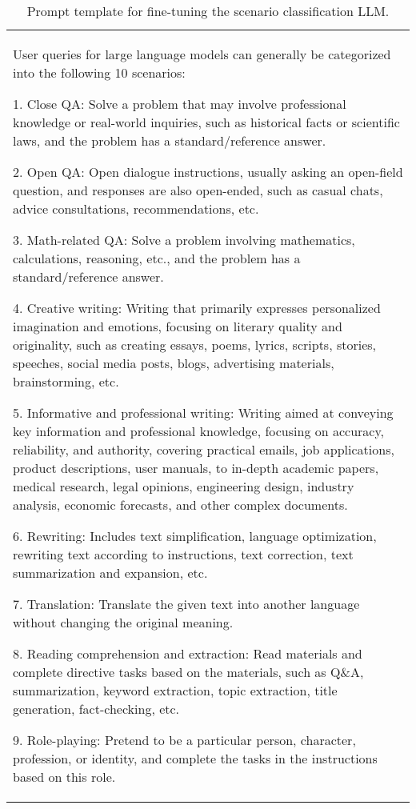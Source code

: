 \begin{table*}[tbh!]
  \caption{Prompt template for fine-tuning the scenario classification LLM.}
  \label{tab:prompt-scenario-classification}
  \small
  \begin{tabularx}{\textwidth}{X}
    \toprule
        User queries for large language models can generally be categorized into the following 10 scenarios:

        1. Close QA: Solve a problem that may involve professional knowledge or real-world inquiries, such as historical facts or scientific laws, and the problem has a standard/reference answer.

        2. Open QA: Open dialogue instructions, usually asking an open-field question, and responses are also open-ended, such as casual chats, advice consultations, recommendations, etc.

        3. Math-related QA: Solve a problem involving mathematics, calculations, reasoning, etc., and the problem has a standard/reference answer.

        4. Creative writing: Writing that primarily expresses personalized imagination and emotions, focusing on literary quality and originality, such as creating essays, poems, lyrics, scripts, stories, speeches, social media posts, blogs, advertising materials, brainstorming, etc.
        
        5. Informative and professional writing: Writing aimed at conveying key information and professional knowledge, focusing on accuracy, reliability, and authority, covering practical emails, job applications, product descriptions, user manuals, to in-depth academic papers, medical research, legal opinions, engineering design, industry analysis, economic forecasts, and other complex documents.
        
        6. Rewriting:  Includes text simplification, language optimization, rewriting text according to instructions, text correction, text summarization and expansion, etc.
        
        7. Translation: Translate the given text into another language without changing the original meaning.
        
        8. Reading comprehension and extraction: Read materials and complete directive tasks based on the materials, such as Q\&A, summarization, keyword extraction, topic extraction, title generation, fact-checking, etc.
        
        9. Role-playing: Pretend to be a particular person, character, profession, or identity, and complete the tasks in the instructions based on this role.
        

\end{tabularx}
\end{table*}
